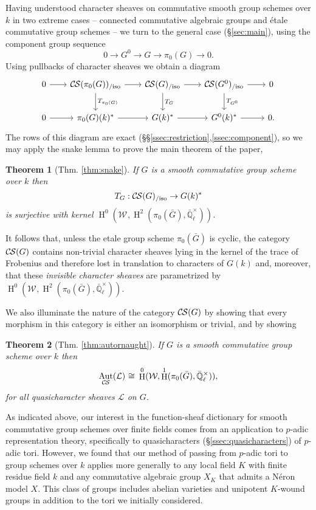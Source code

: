 \documentclass[10pt]{amsart}
\theoremstyle{plain}
\newtheorem*{theorem*}{Theorem}
\theoremstyle{definition}
\theoremstyle{remark}
\newcommand{\EE}{\mathbb{\bar Q}_\ell}
\newcommand{\Fq}{k}
\newcommand{\EEx}{\EE^\times}
\newcommand{\Weil}[1]{\mathcal{W}_{#1}}
\DeclareMathOperator{\Aut}{Aut}
\DeclareMathOperator{\Hh}{H}
\newcommand{\iso}{{\ \cong\ }}
\newcommand{\TrFrob}[1]{T_{#1}}
\newcommand{\cs}[1]{{\mathcal{#1}}}
\newcommand{\CS}{{\mathcal{C\hskip-0.8pt S}}}
\newcommand{\CSiso}[1]{\CS(#1)_{/\text{iso}}}
\newcommand{\bG}{\bar{G}}
\begin{document}
Having understood character sheaves on commutative smooth group schemes over $\Fq$ in two extreme cases --
connected commutative algebraic groups and \'etale commutative group schemes -- we turn to the general case  (\S\ref{sec:main}), using the component group sequence
\[
0 \to G^0 \to G \to \pi_0(G) \to 0.
\]
Using pullbacks of character sheaves we obtain a diagram
\[
  \begin{tikzcd}[row sep=20, column sep=20]
    0 \rar & \CSiso{\pi_0(G)} \rar \dar{\TrFrob{\pi_0(G)}}
    & \CSiso{G} \rar \dar{\TrFrob{G}} & \CSiso{G^0} \rar \dar{\TrFrob{G^0}} & 0\\
    0 \rar & \pi_0(G)(\Fq)^* \rar & G(\Fq)^* \rar & G^0(\Fq)^* \rar & 0.
  \end{tikzcd}
\]
The rows of this diagram are exact (\S\S\ref{ssec:restriction},\ref{ssec:component}), so we may apply the snake lemma to prove the main theorem of the paper,
\begin{theorem*}[{Thm. \ref{thm:snake}}]
If $G$ is a smooth commutative group scheme over $\Fq$ then
\[
\TrFrob{G} : \CSiso{G} \to G(\Fq)^*
\]
is surjective with kernel $\Hh^0(\Weil{},\Hh^2(\pi_0(\bG),\EEx))$.
\end{theorem*}
\noindent
It follows that, unless the etale group scheme $\pi_0(\bG)$ is cyclic, the category $\CS(G)$ contains non-trivial character sheaves lying in the kernel of the trace of Frobenius and therefore lost in translation to characters of $G(\Fq)$ and, moreover, that these {\it invisible character sheaves} are parametrized by $\Hh^0(\Weil{},\Hh^2(\pi_0(\bG),\EEx))$.


We also illuminate the nature of the category $\CS(G)$ by showing that every morphism in this category is either an isomorphism or trivial, and by showing
\begin{theorem*}[{Thm. \ref{thm:autornaught}}]
If $G$ is a smooth commutative group scheme over $\Fq$ then
\[
\Aut_{\CS{}}(\cs{L}) \iso  \Hh^0(\Weil{},\Hh^1(\pi_0(\bG), \EEx)),
\]
for all quasicharacter sheaves $\cs{L}$ on $G$.
\end{theorem*}

As indicated above, our interest in the function-sheaf dictionary for smooth commutative group schemes
over finite fields comes from an application to $p$-adic representation theory,
specifically to quasicharacters (\S\ref{ssec:quasicharacters}) of $p$-adic tori.
However, we found that our method of passing from $p$-adic tori to group schemes over $\Fq$ applies more generally to
any local field $K$ with finite residue field $\Fq$ and any commutative algebraic group $X_K$ that admits a N\'eron model $X$.
This class of groups includes abelian varieties and unipotent $K$-wound groups in addition to the tori we initially considered.
\end{document}
